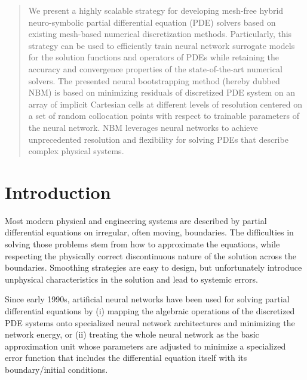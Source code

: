\documentclass{article}
\begin{document}
\begin{abstract}
 
  We present a highly scalable strategy for developing mesh-free hybrid neuro-symbolic partial differential equation (PDE) solvers based on existing mesh-based numerical discretization methods. Particularly, this strategy can be used to efficiently train neural network surrogate models for the solution functions and operators of PDEs while retaining the accuracy and convergence properties of the state-of-the-art numerical solvers. The presented neural bootstrapping method (hereby dubbed NBM) is based on minimizing residuals of discretized PDE system on an array of implicit Cartesian cells at different levels of resolution centered on a set of random collocation points with respect to trainable parameters of the neural network. NBM leverages neural networks to achieve unprecedented resolution and flexibility for solving PDEs that describe complex physical systems.  
\end{abstract}



\section{Introduction}
Most modern physical and engineering systems are described by partial differential equations on irregular, often moving, boundaries. The difficulties in solving those problems stem from how to approximate the equations, while respecting the physically correct discontinuous nature of the solution across the boundaries. Smoothing strategies are easy to design, but unfortunately introduce unphysical characteristics in the solution and lead to systemic errors.

Since early 1990s, artificial neural networks have been used for solving partial differential equations by (i) mapping the algebraic operations of the discretized PDE systems onto specialized neural network architectures and minimizing the network energy, or (ii) treating the whole neural network as the basic approximation unit whose parameters are adjusted to minimize a specialized error function that includes the differential equation itself with its boundary/initial conditions. 
\end{document}
